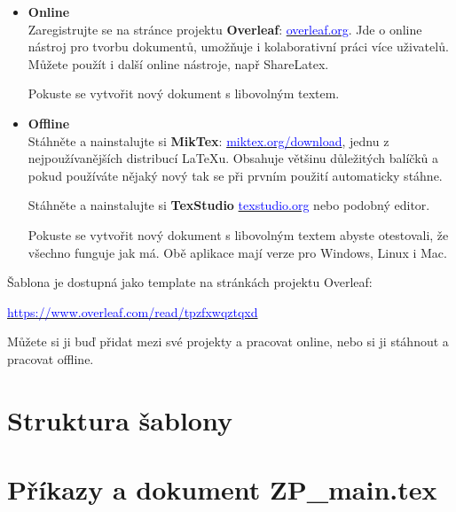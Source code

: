 \begin{itemize}

\item \textbf{Online}\\
Zaregistrujte se na stránce projektu \textbf{Overleaf}: \href{https://www.overleaf.com/signup?ref=e484ea92ee94}{\textcolor{blue}{overleaf.org}}. Jde o online nástroj pro tvorbu dokumentů, umožňuje i kolaborativní práci více uživatelů. Můžete použít i další online nástroje, např ShareLatex.

Pokuste se vytvořit nový dokument s libovolným textem.

\item \textbf{Offline}\\
Stáhněte a nainstalujte si \textbf{MikTex}: \href{https://miktex.org/download}{\textcolor{blue}{miktex.org/download}}, jednu z nejpoužívanějších distribucí LaTeXu. Obsahuje většinu důležitých balíčků a pokud používáte nějaký nový tak se při prvním použití automaticky stáhne.

Stáhněte a nainstalujte si \textbf{TexStudio} \href{https://www.texstudio.org/}{\textcolor{blue}{texstudio.org}} nebo podobný editor. 

Pokuste se vytvořit nový dokument s libovolným textem abyste otestovali, že všechno funguje jak má. Obě aplikace mají verze pro Windows, Linux i Mac.

\end{itemize}

Šablona je dostupná jako template na stránkách projektu Overleaf:
\vspace{-0.55cm}
\begin{center}
\large\href{https://www.texstudio.org/}{\textcolor{blue}{https://www.overleaf.com/read/tpzfxwqztqxd}}
\end{center}

\vspace{-0.2cm}
Můžete si ji buď přidat mezi své projekty a pracovat online, nebo si ji stáhnout a pracovat offline.


\section{Struktura \v{s}ablony}

\section{P\v{r}\'{i}kazy a dokument ZP\_main.tex }

